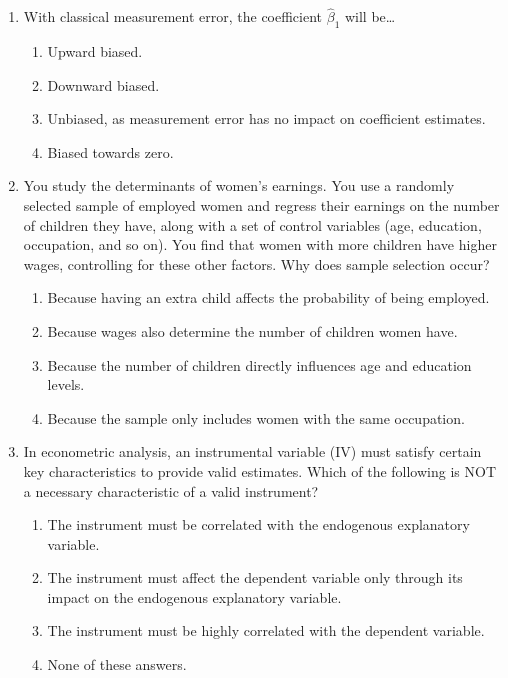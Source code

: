 \documentclass{article}
\begin{document}
\begin{enumerate}
    \item With classical measurement error, the coefficient $\hat{\beta}_1$ will be…
    \begin{enumerate}[label=\alph*)]
        \item Upward biased.
        \item Downward biased.
        \item Unbiased, as measurement error has no impact on coefficient estimates.
        \item Biased towards zero. %
    \end{enumerate}\vspace{.25cm}

    \item You study the determinants of women’s earnings. You use a randomly selected sample of employed women and regress their earnings on the number of children they have, along with a set of control variables (age, education, occupation, and so on). You find that women with more children have higher wages, controlling for these other factors. Why does sample selection occur?
    \begin{enumerate}[label=\alph*)]
        \item Because having an extra child affects the probability of being employed.
        \item Because wages also determine the number of children women have.
        \item Because the number of children directly influences age and education levels.
        \item Because the sample only includes women with the same occupation.
    \end{enumerate}\vspace{.25cm}

    \item In econometric analysis, an instrumental variable (IV) must satisfy certain key characteristics to provide valid estimates. Which of the following is NOT a necessary characteristic of a valid instrument?
    \begin{enumerate}[label=\alph*)]
        \item The instrument must be correlated with the endogenous explanatory variable.
        \item  The instrument must affect the dependent variable only through its impact on the endogenous explanatory variable.
        \item The instrument must be highly correlated with the dependent variable.
        \item None of these answers.
    \end{enumerate}\vspace{.25cm}


\end{enumerate}
\end{document}
